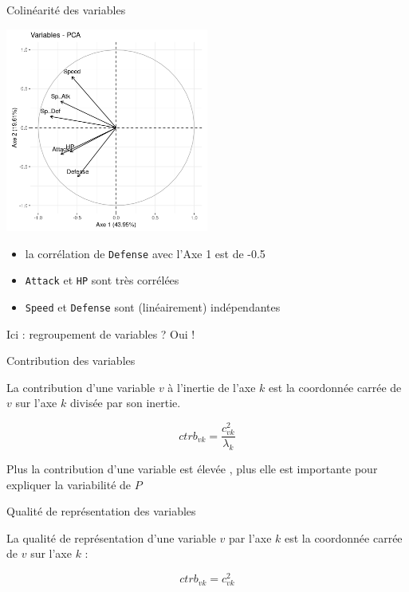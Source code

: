 \documentclass{beamer}
\begin{document}
\begin{frame}{Colinéarité des variables}

\begin{center}
\includegraphics[width=0.5\textwidth,keepaspectratio]{img/cercle_trigo_ACP_var.png}
\end{center}


\begin{itemize}
\item la corrélation de \texttt{Defense} avec l'Axe 1 est de -0.5
\item \texttt{Attack} et \texttt{HP} sont très corrélées
\item \texttt{Speed} et \texttt{Defense} sont (linéairement) indépendantes
\end{itemize}



Ici : regroupement de variables ? Oui ! 


\end{frame}




\begin{frame}{Contribution des variables}

La \alert{contribution} d'une  variable $v$ à l'inertie de l'axe $k$  est la coordonnée carrée  de $v$ sur l'axe $k$ divisée par son inertie.

$$ ctrb_{vk} =\frac{c_{vk}^2}{\lambda_k} $$ 


Plus la contribution d'une variable est élevée , plus elle est importante pour expliquer la variabilité de $P$


\end{frame}


\begin{frame}{Qualité de représentation des variables}

La \alert{qualité de représentation} d'une  variable $v$ par l'axe $k$  est la coordonnée carrée  de $v$ sur l'axe $k$ :

$$ctrb_{vk} = c_{vk}^2$$ 

\end{frame}
\end{document}
